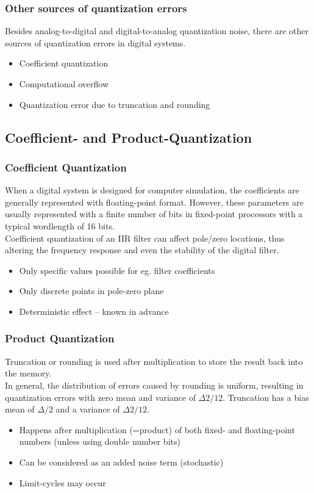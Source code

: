 \subsubsection{Other sources of quantization errors}
Besides analog-to-digital and digital-to-analog quantization noise, there are other sources of quantization errors in digital systems.

\begin{itemize}
	\item Coefficient quantization
	\item Computational overflow
	\item Quantization error due to truncation and rounding
\end{itemize}

\subsection{Coefficient- and Product-Quantization}
\subsubsection{Coefficient Quantization}
When a digital system is designed for computer simulation, the coefficients are generally represented with floating-point format. 
However, these parameters are usually represented with a finite number of bits in fixed-point processors with a typical wordlength of 16 bits.\\

Coefficient quantization of an IIR filter can affect pole/zero locations, thus altering the frequency response and even the stability of the digital filter.

\begin{itemize}
	\item Only specific values possible for eg. filter coefficients
	\item Only discrete points in pole-zero plane
	\item Deterministic effect – known in advance
\end{itemize}

\subsubsection{Product Quantization}
Truncation or rounding is used after multiplication to store the result back into the memory.\\

In general, the distribution of errors caused by rounding is uniform, resulting in quantization errors with zero mean and variance of $\Delta2/12$. Truncation has a bias mean of $\Delta/2$ and a variance of $\Delta2/12$.
\begin{itemize}
	\item Happens after multiplication (=product) of both fixed- and floating-point numbers (unless	using double number bits)
	\item Can be considered as an added noise term (stochastic)
	\item Limit-cycles may occur
\end{itemize}

